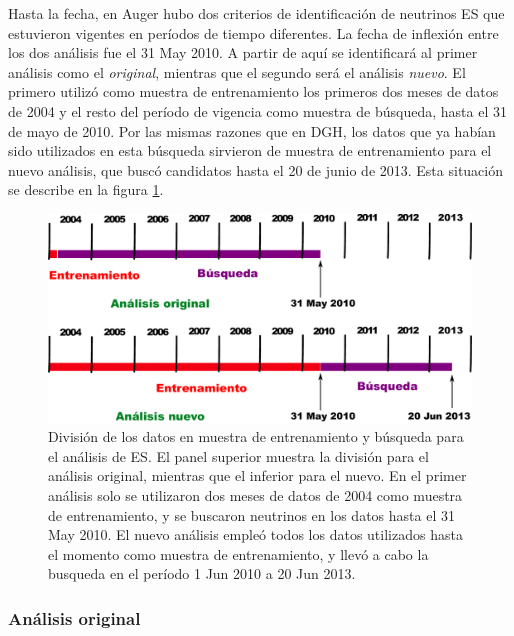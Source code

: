 	Hasta la fecha, en Auger hubo dos criterios de identificación de neutrinos ES que estuvieron vigentes en períodos de tiempo diferentes. 
	La fecha de inflexión entre los dos análisis fue el 31 May 2010.
	A partir de aquí se identificará al primer análisis como el \emph{original}, mientras que el segundo será el análisis \emph{nuevo}.
	El primero utilizó como muestra de entrenamiento los primeros dos meses de datos de 2004 y el resto del período de vigencia como muestra de búsqueda, hasta el 31 de mayo de 2010.
	Por las mismas razones que en DGH, los datos que ya hab\'ian sido utilizados en esta búsqueda sirvieron de muestra de entrenamiento para el nuevo análisis, que busc\'o candidatos hasta el 20 de junio de 2013.
	Esta situación se describe en la figura \ref{fig:periodosES}.
	\begin{figure}[ht]
	\begin{center}
	\includegraphics[width=\textwidth]{fig/seleccionAuger/periodosES}
	\caption{División de los datos en muestra de entrenamiento y búsqueda para el análisis de ES.
	El panel superior muestra la división para el análisis original, mientras que el inferior para el nuevo.
	En el primer análisis solo se utilizaron dos meses de datos de 2004 como muestra de entrenamiento, y se buscaron neutrinos en los datos hasta el 31 May 2010.
	El nuevo análisis empleó todos los datos utilizados hasta el momento como muestra de entrenamiento, y llevó a cabo la busqueda en el período 1 Jun 2010 a 20 Jun 2013.}
	\label{fig:periodosES}
	\end{center}
	\end{figure}
	
	\subsubsection{Análisis original}
	

